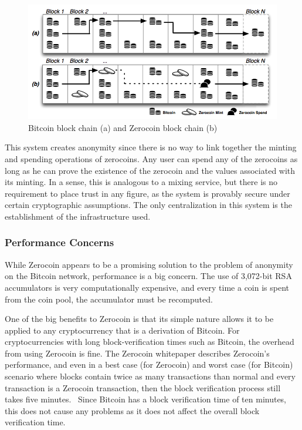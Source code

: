 \documentclass[11pt]{article}
\begin{document}
\begin{figure}[H]
    \centering
    \caption[Bitcoin block chain (a) and Zerocoin block chain (b)]{Bitcoin block chain (a) and Zerocoin block chain (b)~\cite{miers13}}
    \includegraphics[width=\linewidth]{figures/zerocoin.png}
\end{figure}

This system creates anonymity since there is no way to link together the minting and spending operations of zerocoins.
Any user can spend any of the zerocoins as long as he can prove the existence of the zerocoin and the values associated
with its minting. In a sense, this is analogous to a mixing service, but there is no requirement to place trust in any
figure, as the system is provably secure under certain cryptographic assumptions. The only centralization in this system
is the establishment of the infrastructure used.

\subsubsection{Performance Concerns}
While Zerocoin appears to be a promising solution to the problem of anonymity on the Bitcoin network, performance is a
big concern. The use of 3,072-bit RSA accumulators is very computationally expensive, and every time a coin is spent
from the coin pool, the accumulator must be recomputed.

One of the big benefits to Zerocoin is that its simple nature allows it to be applied to any cryptocurrency that is a
derivation of Bitcoin. For cryptocurrencies with long block-verification times such as Bitcoin, the overhead from using
Zerocoin is fine. The Zerocoin whitepaper describes Zerocoin's performance, and even in a best case (for Zerocoin) and
worst case (for Bitcoin) scenario where blocks contain twice as many transactions than normal and every transaction is a
Zerocoin transaction, then the block verification process still takes five minutes.~\cite{miers13} Since Bitcoin has a
block verification time of ten minutes, this does not cause any problems as it does not affect the overall block
verification time.
\end{document}
